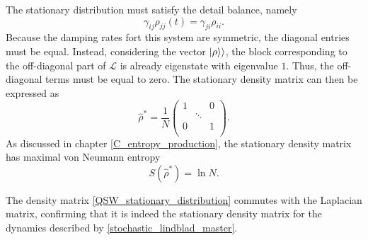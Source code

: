 The stationary distribution must satisfy the detail balance, namely
\begin{equation}
    \gamma_{ij}\rho_{jj}(t) = \gamma_{ji}\rho_{ii}.
\end{equation}
Because the damping rates fort this system are symmetric, the diagonal entries must be equal. 
Instead, considering the vector $\lvert\rho\rangle\rangle$, the block corresponding to the off-diagonal part of $\mathcal{L}$ is already eigenstate with eigenvalue $1$. Thus, the off-diagonal terms must be equal to zero.
The stationary density matrix can then be expressed as
\begin{equation}\label{QSW_stationary_distribution}
    \hat\rho^* = \frac{1}{N}\begin{pmatrix}
        1&&0\\
        &\ddots&\\
        0&&1\\
    \end{pmatrix}.
\end{equation}
As discussed in chapter \ref{C_entropy_production}, the stationary density matrix has maximal von Neumann entropy 
\begin{equation}
    S\left(\hat\rho^*\right) = \ln N.
\end{equation}

The density matrix \eqref{QSW_stationary_distribution} commutes with the Laplacian matrix, confirming that it is indeed the stationary density matrix for the dynamics described by \eqref{stochastic_lindblad_master}.

\begin{comment}
    Instead, adding also the coherent part, we need to go in the basis $\{\ket{\lambda}\}$ eigenvector of $\hat L$. 
    The decoherent part becomes
    \begin{equation}
    \begin{split}
    \mathcal{L}^{cl}\ket{\lambda}\bra{\lambda} &= \sum_{ij}\gamma_{ij}\left[\hat J_{ij} \ket{\lambda}\bra{\lambda}\hat J_{ij}^\dagger -\frac{1}{2} \left\{ \hat J_{ij}^\dagger \hat J_{ij}, \ket{\lambda}\bra{\lambda}\right\}\right]\\
        &= \sum_{ij}\gamma_{ij}\left[\ket{i}\braket{j}{\lambda}\braket{\lambda}{j}\bra{i} -\frac{1}{2}\ket{j}\braket{i}{i}\braket{j}{\lambda}\bra{\lambda} - \frac{1}{2}\ket{\lambda}\braket{\lambda}{j}\braket{i}{i}\bra{j} \right]\\
        & = \sum_{ij}\gamma_{ij}\left[|\braket{j}{\lambda}|^2\ket{i}\bra{i} -\frac{1}{2}\ket{j}\braket{j}{\lambda}\bra{\lambda} - \frac{1}{2}\ket{\lambda}\braket{\lambda}{j}\bra{j} \right]\\
        &= \sum_{ij}\left[\pi_{ij}\rho_j\ket{i}\bra{i} -\frac{\pi_{ij}}{2}\braket{j}{\lambda}\ket{j}\bra{\lambda} - \frac{\pi_{ij}}{2}\braket{\lambda}{j}\ket{\lambda}\bra{j} \right]
    \end{split}
\end{equation}
\end{comment}
